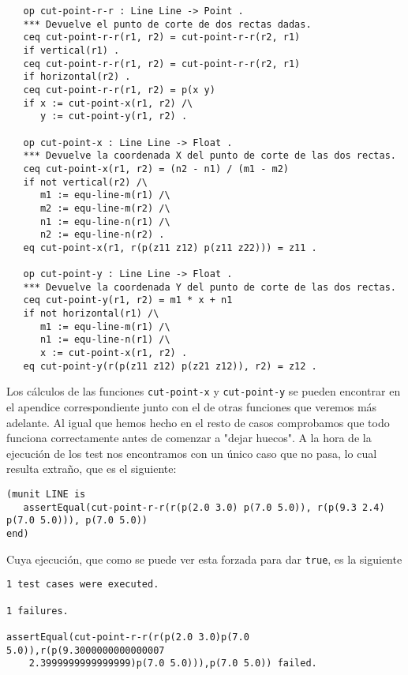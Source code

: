 {\codesize
\begin{verbatim}	
   op cut-point-r-r : Line Line -> Point .
   *** Devuelve el punto de corte de dos rectas dadas.
   ceq cut-point-r-r(r1, r2) = cut-point-r-r(r2, r1)
   if vertical(r1) .
   ceq cut-point-r-r(r1, r2) = cut-point-r-r(r2, r1)
   if horizontal(r2) .
   ceq cut-point-r-r(r1, r2) = p(x y)
   if x := cut-point-x(r1, r2) /\
      y := cut-point-y(r1, r2) .

   op cut-point-x : Line Line -> Float .
   *** Devuelve la coordenada X del punto de corte de las dos rectas.
   ceq cut-point-x(r1, r2) = (n2 - n1) / (m1 - m2)
   if not vertical(r2) /\
      m1 := equ-line-m(r1) /\
      m2 := equ-line-m(r2) /\
      n1 := equ-line-n(r1) /\
      n2 := equ-line-n(r2) .
   eq cut-point-x(r1, r(p(z11 z12) p(z11 z22))) = z11 .
	
   op cut-point-y : Line Line -> Float .
   *** Devuelve la coordenada Y del punto de corte de las dos rectas.
   ceq cut-point-y(r1, r2) = m1 * x + n1
   if not horizontal(r1) /\
      m1 := equ-line-m(r1) /\
      n1 := equ-line-n(r1) /\
      x := cut-point-x(r1, r2) .
   eq cut-point-y(r(p(z11 z12) p(z21 z12)), r2) = z12 .
\end{verbatim}
}

Los cálculos de las funciones \texttt{cut-point-x} y \texttt{cut-point-y} se pueden encontrar en el apendice correspondiente junto con el de otras funciones que veremos más adelante. Al igual que hemos hecho en el resto de casos comprobamos que todo funciona correctamente antes de comenzar a "dejar huecos". A la hora de la ejecución de los test nos encontramos con un único caso que no pasa, lo cual resulta extraño, que es el siguiente: \par

{\codesize
\begin{verbatim}
(munit LINE is
   assertEqual(cut-point-r-r(r(p(2.0 3.0) p(7.0 5.0)), r(p(9.3 2.4) p(7.0 5.0))), p(7.0 5.0))
end)
\end{verbatim}
}

Cuya ejecución, que como se puede ver esta forzada para dar \texttt{true}, es la siguiente

{\codesize
\begin{verbatim}
1 test cases were executed.

1 failures.

assertEqual(cut-point-r-r(r(p(2.0 3.0)p(7.0 5.0)),r(p(9.3000000000000007
    2.3999999999999999)p(7.0 5.0))),p(7.0 5.0)) failed.

\end{verbatim}
}


